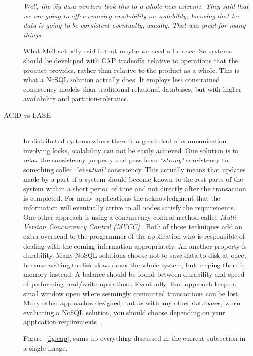 \begin{description}
\begin{flushright}
      \emph{Well, the big data vendors took this to a whole new extreme. They
            said that we are going to offer amazing availability or scalability,
            knowing that the data is going to be consistent eventually, usually.
            That was great for many things.}~\cite{peter_mell}
    \end{flushright}

    What Mell actually said is that maybe we need a balance. So systems should
    be developed with CAP tradeoffs, relative to operations that the product
    provides, rather than relative to the product as a whole. This is what a
    NoSQL solution actually does. It employs less constrained consistency models
    than traditional relational databases, but with higher availability and
    partition-tolerance.

  \item[ACID vs BASE] \hfill \\
    In distributed systems where there is a great deal of communication involving
    locks, scalability can not be easily achieved. One solution is to relax the
    consistency property and pass from \emph{``strong"} consistency to something
    called \emph{``eventual"} consistency. This actually means that updates made
    by a part of a
    system should become known to the rest parts of the system within a short
    period of time and not directly after the transaction is completed. For many
    applications the acknowledgment that the information will eventually arrive
    to all nodes satisfy the requirements. One other approach is using a concurrency
    control method called \emph{Multi Version Concurrency Control (MVCC)}
    .
    Both of those techniques add an extra overhead to the programmer of
    the application who is responsible of dealing with the coming information
    appropriately. An another property is durability. Many NoSQL solutions
    choose not to save data to disk at once, because writing to disk slows down
    the whole system, but keeping them in memory instead. A balance should be
    found between durability and speed of performing read/write operations.
    Eventually, that approach keeps a small window open where seemingly committed
    transactions can be lost. Many other approaches designed, but as with any
    other databases, when evaluating a NoSQL solution, you should choose depending
    on your application requirements~\cite{burd}.


    Figure~\ref{fig:cap}, sums up everything discussed in the current subsection
    in a single image.


\end{description}

